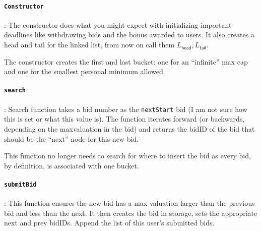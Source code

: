 \documentclass{article}
\newcommand{\msf}[1]{\ensuremath{\mathsf{#1}}}
\begin{document}
\paragraph{\texttt{Constructor}}: 
The constructor does what you might expect with initializing important deadlines like withdrawing bids and the bonus awarded to users.
It also creates a head and tail for the linked list, from now on call them $L_{\msf{head}},L_{\msf{tail}}$. 

{\color{red} The constructor creates the first and last bucket: one for an ``infinite'' max cap and one for the smallest personal minimum allowed.}

\paragraph{\texttt{search}}: 
Search function takes a bid number as the \texttt{nextStart} bid (I am not sure how this is set or what this value is). 
The function iterates forward (or backwards, depending on the maxvaluation in the bid) and returns the bidID of the bid that should be the ``next'' node for this new bid.

{\color{red} This function no longer needs to search for where to insert the bid as every bid, by definition, is associated with one bucket.}

\paragraph{\texttt{submitBid}}:
This function ensures the new bid has a max valuation larger than the previous bid and less than the next. 
It then creates the bid in storage, sets the appropriate next and prev bidIDs. 
Append the list of this user's submitted bids.
\end{document}
